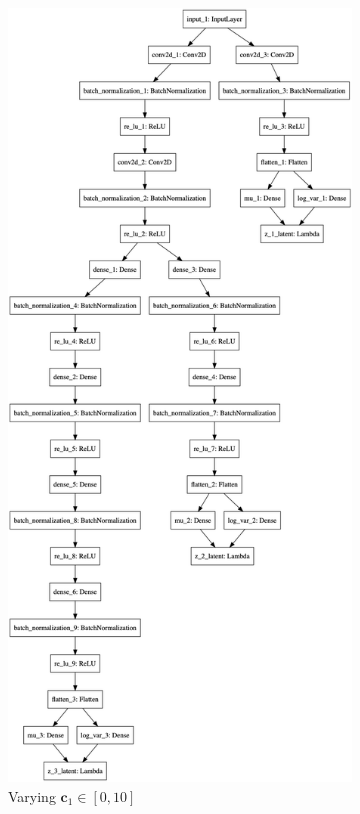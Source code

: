 \begin{figure}
\begin{subfigure}{.45\textwidth}
        \includegraphics[height=.8\textheight]{images/vlae_encoder.png}
        \caption{Varying $\bm{c}_1 \in [0, 10]$}
    \end{subfigure}%
    \begin{subfigure}{.45\textwidth}

\end{subfigure}
\end{figure}
